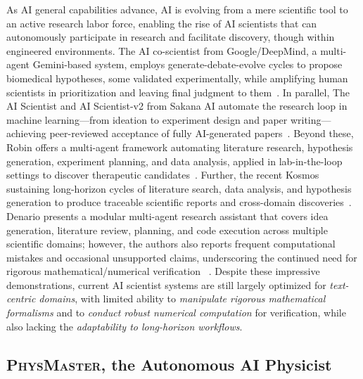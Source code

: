 \documentclass[11pt, a4paper, logo, copyright, nonumbering]{SAI}
\newcommand{\agent}{\textsc{PhysMaster}\xspace}
\begin{document}
As AI general capabilities advance, AI is evolving from a mere scientific tool to an active research labor force, enabling the rise of AI scientists that can autonomously participate in research and facilitate discovery, though within engineered environments. The AI co-scientist from Google/DeepMind, a multi-agent Gemini-based system, employs generate-debate-evolve cycles to propose biomedical hypotheses, some validated experimentally, while amplifying human scientists in prioritization and leaving final judgment to them~\cite{natarajan2025aicoscientist}. In parallel, The AI Scientist and AI Scientist-v2 from Sakana AI automate the research loop in machine learning—from ideation to experiment design and paper writing—achieving peer-reviewed acceptance of fully AI-generated papers~\cite{lu2024aiscientist,yamada2025aiscientistv2}. Beyond these, Robin offers a multi-agent framework automating literature research, hypothesis generation, experiment planning, and data analysis, applied in lab-in-the-loop settings to discover therapeutic candidates~\cite{ghareeb2025robin}. Further, the recent Kosmos sustaining long-horizon cycles of literature search, data analysis, and hypothesis generation to produce traceable scientific reports and cross-domain discoveries~\cite{mitchener2025kosmos}. Denario presents a modular multi-agent research assistant that covers idea generation, literature review, planning, and code execution across multiple scientific domains; however, the authors also reports frequent computational mistakes and occasional unsupported claims, underscoring the continued need for rigorous mathematical/numerical verification ~\cite{villaescusa2025denario}. Despite these impressive demonstrations, current AI scientist systems are still largely optimized for \emph{text-centric domains}, with limited ability to \emph{manipulate rigorous mathematical formalisms} and to \emph{conduct robust numerical computation} for verification, while also lacking the \emph{adaptability to long-horizon workflows}.

\subsection{\agent, the Autonomous AI Physicist}
\end{document}
